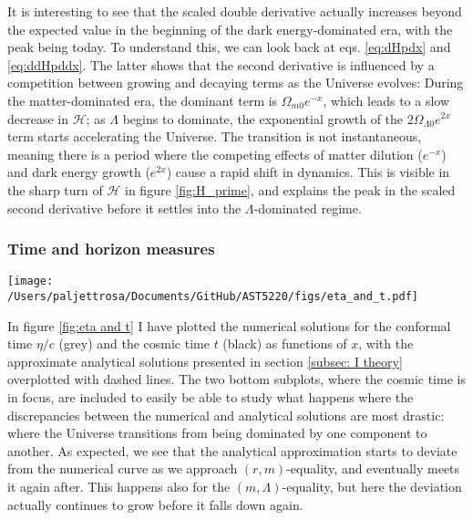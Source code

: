 \documentclass{aa}
\numberwithin{equation}{section}
\numberwithin{table}{section}
\numberwithin{figure}{section}
\begin{document}
It is interesting to see that the scaled double derivative actually increases beyond the expected value in the beginning of the dark energy-dominated era, with the peak being today. To understand this, we can look back at eqs. \eqref{eq:dHpdx} and \eqref{eq:ddHpddx}. The latter shows that the second derivative is influenced by a competition between growing and decaying terms as the Universe evolves: During the matter-dominated era, the dominant term is $\Omega_{m0} e^{-x}$, which leads to a slow decrease in $\mathcal{H}$; as $\Lambda$ begins to dominate, the exponential growth of the $2\Omega_{\Lambda 0} e^{2x}$ term starts accelerating the Universe. The transition is not instantaneous, meaning there is a period where the competing effects of matter dilution ($e^{-x}$) and dark energy growth ($e^{2x}$) cause a rapid shift in dynamics. This is visible in the sharp turn of $\mathcal{H}$ in figure \ref{fig:H_prime}, and explains the peak in the scaled second derivative before it settles into the $\Lambda$-dominated regime.


\subsubsection{Time and horizon measures}
\begin{figure*}
  \centering
  \texttt{[image: /Users/paljettrosa/Documents/GitHub/AST5220/figs/eta\_and\_t.pdf]}
  \caption{Conformal time $\eta(x)$ (grey) and cosmic time $t(x)$ (black) compared with analytical approximations (dashed). Deviations near equality points arise due to gradual transitions between dominant energy components. This is highlighted in the bottom subplots for the cosmic time.}\label{fig:eta and t}
\end{figure*}

In figure \ref{fig:eta and t} I have plotted the numerical solutions for the conformal time $\eta/c$ (grey) and the cosmic time $t$ (black) as functions of $x$, with the approximate analytical solutions presented in section \ref{subsec: I theory} overplotted with dashed lines. The two bottom subplots, where the cosmic time is in focus, are included to easily be able to study what happens where the discrepancies between the numerical and analytical solutions are most drastic: where the Universe transitions from being dominated by one component to another. As expected, we see that the analytical approximation starts to deviate from the numerical curve as we approach $(r,m)$-equality, and eventually meets it again after. This happens also for the $(m,\Lambda)$-equality, but here the deviation actually continues to grow before it falls down again.
\end{document}

